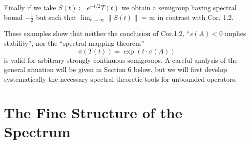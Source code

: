 Finally if we take $S(t) \coloneqq e^{-t/2}T(t)$ we obtain a semigroup having spectral bound $-\frac{1}{2}$ but such that $\lim_{t \to \infty} \|S(t)\| = \infty$ in contrast with Cor. 1.2.

These examples show that neither the conclusion of Cor.1.2, \ie \enquote{$s(A) < 0$ implies stability}, nor the \enquote{spectral mapping theorem}
\[
    \sigma(T(t)) = \exp(t\cdot\sigma(A))
\]
is valid for arbitrary strongly continuous semigroups.
A careful analysis of the general situation will be given in Section 6 below, but we will first develop systematically the necessary spectral theoretic tools for unbounded operators.
\section{The Fine Structure of the Spectrum}\label{sec:a3-2}

